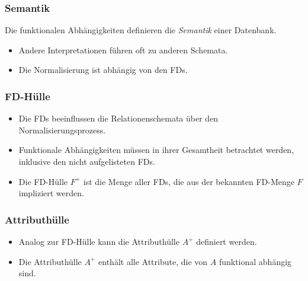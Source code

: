 \documentclass[a4paper, 11pt, accentcolor = tud3b]{tudreport}
\begin{document}
                \subsubsection{Semantik} %
                	Die funktionalen Abhängigkeiten definieren die \textit{Semantik} einer Datenbank.
                    \begin{itemize}
               			\item Andere Interpretationen führen oft zu anderen Schemata.
               			\item Die Normalisierung ist abhängig von den FDs.
                    \end{itemize}

                \subsubsection{FD-Hülle} %
                    \begin{itemize}
                    	\item Die FDs beeinflussen die Relationenschemata über den Normalisierungsprozess.
                    	\item Funktionale Abhängigkeiten müssen in ihrer Gesamtheit betrachtet werden, inklusive den nicht aufgelisteten FDs.
                    	\item Die FD-Hülle \(F^+\) ist die Menge aller FDs, die aus der bekannten FD-Menge \(F\) impliziert werden.
                    \end{itemize}

                \subsubsection{Attributhülle} %
                    \begin{itemize}
                    	\item Analog zur FD-Hülle kann die Attributhülle \(A^+\) definiert werden.
                    	\item Die Attributhülle \(A^+\) enthält alle Attribute, die von \(A\) funktional abhängig sind.
                    \end{itemize}
\end{document}
